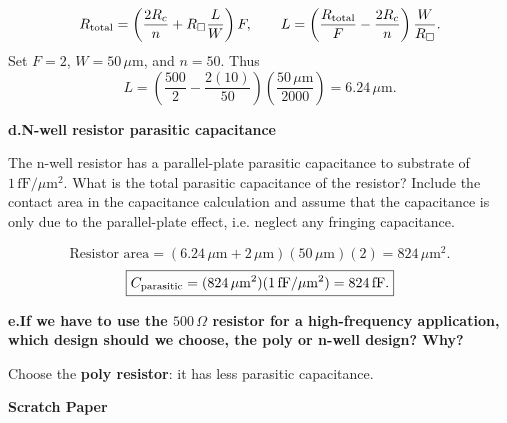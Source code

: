 \solutionlabel
\[
R_{\rm total}=\left(\frac{2R_c}{n}+R_{\square}\frac LW\right)F,
\qquad
L=\left(\frac{R_{\rm total}}F-\frac{2R_c}n\right)\frac W{R_{\square}}.
\]
Set $F=2$, $W=50\,\mu\mathrm m$, and $n=50$. Thus
\[
L=\left(\frac{500}2-\frac{2(10)}{50}\right)
\left(\frac{50\,\mu\mathrm m}{2000}\right)
=\boxed{6.24\,\mu\mathrm m}.
\]
\begin{center}
\end{center}

\vspace{.45in}
\textbf{d.\quad N-well resistor parasitic capacitance}\par
The n-well resistor has a parallel-plate parasitic capacitance to substrate of
$1\,\mathrm{fF}/\mu\mathrm m^2$. What is the total parasitic capacitance of the
resistor? Include the contact area in the capacitance calculation and assume
that the capacitance is only due to the parallel-plate effect, i.e. neglect
any fringing capacitance.

\solutionlabel
\[
\text{Resistor area}=(6.24\,\mu\mathrm m+2\,\mu\mathrm m)
(50\,\mu\mathrm m)(2)=824\,\mu\mathrm m^2.
\]
\[
\boxed{C_{\rm parasitic}=(824\,\mu\mathrm m^2)
       (1\,\mathrm{fF}/\mu\mathrm m^2)=824\,\mathrm{fF}.}
\]
\par\vspace{.25in}
\textbf{e.\quad If we have to use the $500\,\Omega$ resistor for a high-frequency
application, which design should we choose, the poly or n-well design? Why?}

\solutionlabel
Choose the \textbf{poly resistor}: it has less parasitic capacitance.
\newpage

\begin{center}
{\sffamily\bfseries\fontsize{17}{20}\selectfont Scratch Paper}
\end{center}
\vfill
\null
\clearpage
\endgroup

